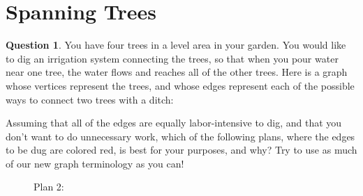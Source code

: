 \documentclass[article, 12pt]{article}
\theoremstyle{definition}
\newtheorem{question}{Question}
\begin{document}
    \section{Spanning Trees}
    \begin{question}
        You have four trees in a level area in your garden. You would like to dig an irrigation system connecting the trees, so that when you pour water near one tree, the water flows and reaches all of the other trees. Here is a graph whose vertices represent the trees, and whose edges represent each of the possible ways to connect two trees with a ditch:
        \begin{figure}[H]
            \centering
        \end{figure}
        Assuming that all of the edges are equally labor-intensive to dig, and that you don't want to do unnecessary work, which of the following plans, where the edges to be dug are colored red, is best for your purposes, and why? Try to use as much of our new graph terminology as you can!
        \begin{figure}[H]
            \centering
            \begin{minipage}[b]{0.2\linewidth}
                \caption*{Plan 1:}
                \centering
            \end{minipage}
            \begin{minipage}[b]{0.2\linewidth}
                \caption*{Plan 2:}
                \centering
\end{minipage}
\end{figure}
\end{question}
\end{document}
